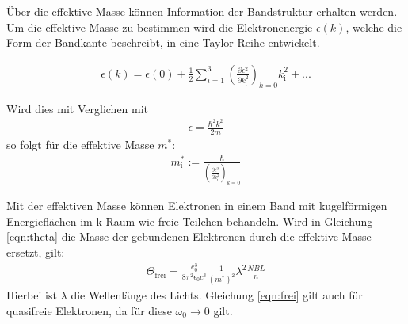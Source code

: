 Über die effektive Masse können Information der Bandstruktur erhalten werden.
Um die effektive Masse zu bestimmen wird die Elektronenergie $\epsilon (k)$,
welche die Form der Bandkante beschreibt, in eine Taylor-Reihe entwickelt.

\begin{align}
  \epsilon(k) = \epsilon (0) + \frac{1}{2} \sum_{i=1}^3 \left(\frac{\partial \epsilon^2}{\partial k^2_{\mathrm{i}}}\right)_{k=0} k_{\mathrm{i}}^2 + ...
\end{align}

Wird dies mit Verglichen mit
\begin{align}
  \epsilon = \frac{\hbar^2 k^2}{2m}
\end{align}
so folgt für die effektive Masse $m^*$:
\begin{align}
  m^*_{\mathrm{i}} := \frac{\hbar}{\left(\frac{\partial \epsilon^2}{\partial k^2_{\mathrm{i}}}\right)_{k=0}}
\end{align}

Mit der effektiven Masse können Elektronen in einem Band mit kugelförmigen
Energieflächen im k-Raum wie freie Teilchen behandeln.
Wird in Gleichung \ref{eqn:theta} die Masse der gebundenen Elektronen durch die effektive Masse ersetzt, gilt:
\begin{align}
  \Theta_{\mathrm{frei}} = \frac{e^3_0}{8 \pi^2 \epsilon_0 c^3}\frac{1}{\left(m^{*}\right)^2} \lambda^2 \frac{NBL}{n} \label{eqn:frei}
\end{align}
Hierbei ist $\lambda$ die Wellenlänge des Lichts.
Gleichung \ref{eqn:frei} gilt auch für quasifreie Elektronen, da für diese $\omega_0 \rightarrow 0$ gilt.
